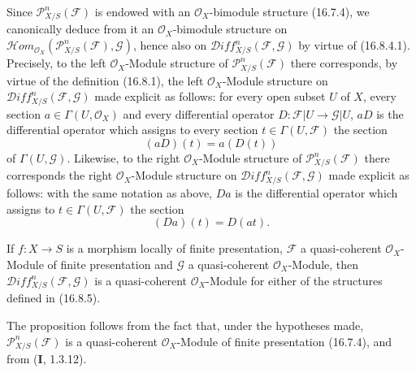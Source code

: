 \begin{env}[16.8.5]
\label{IV.16.8.5}
Since $\mathscr{P}_{X/S}^n(\mathscr{F})$ is endowed with an
$\mathcal{O}_X$-bimodule structure (16.7.4), we canonically deduce from it an
$\mathcal{O}_X$-bimodule structure on
$\mathscr{H}\!om_{\mathcal{O}_X}
(\mathscr{P}_{X/S}^n(\mathscr{F}),\mathscr{G})$, hence also on
$\mathscr{D}\!iff_{X/S}^n(\mathscr{F},\mathscr{G})$ by virtue of (16.8.4.1).
Precisely, to the left $\mathcal{O}_X$-Module structure of
$\mathscr{P}_{X/S}^n(\mathscr{F})$ there corresponds, by virtue of the
definition (16.8.1), the left $\mathcal{O}_X$-Module structure on
$\mathscr{D}\!iff_{X/S}^n(\mathscr{F},\mathscr{G})$ made explicit as follows:
for every open subset $U$ of $X$, every section
$a\in\Gamma(U,\mathcal{O}_X)$ and every differential operator
$D:\mathscr{F}|U\to\mathscr{G}|U$, $aD$ is the differential operator which
assigns to every section $t\in\Gamma(U,\mathscr{F})$ the section
\[
  (aD)(t)=a(D(t))
  \tag{16.8.5.1}
  \label{IV.16.8.5.1}
\]
of $\Gamma(U,\mathscr{G})$. Likewise, to the right
$\mathcal{O}_X$-Module structure of $\mathscr{P}_{X/S}^n(\mathscr{F})$
there corresponds the right $\mathcal{O}_X$-Module structure on
$\mathscr{D}\!iff_{X/S}^n(\mathscr{F},\mathscr{G})$ made explicit as follows:
with the same notation as above, $Da$ is the differential operator which
assigns to $t\in\Gamma(U,\mathscr{F})$ the section
\[
  (Da)(t)=D(at).
  \tag{16.8.5.2}
  \label{IV.16.8.5.2}
\]
\end{env}

\begin{proposition}[16.8.6]
\label{IV.16.8.6}
If $f:X\to S$ is a morphism locally of finite presentation,
$\mathscr{F}$ a quasi-coherent $\mathcal{O}_X$-Module of finite presentation
and $\mathscr{G}$ a quasi-coherent $\mathcal{O}_X$-Module, then
$\mathscr{D}\!iff_{X/S}^n(\mathscr{F},\mathscr{G})$ is a quasi-coherent
$\mathcal{O}_X$-Module for either of the structures defined
in \textup{(16.8.5)}.
\end{proposition}

The proposition follows from the fact that, under the hypotheses made,
$\mathscr{P}_{X/S}^n(\mathscr{F})$ is a quasi-coherent $\mathcal{O}_X$-Module
of finite presentation (16.7.4), and from (\textbf{I}, 1.3.12).


